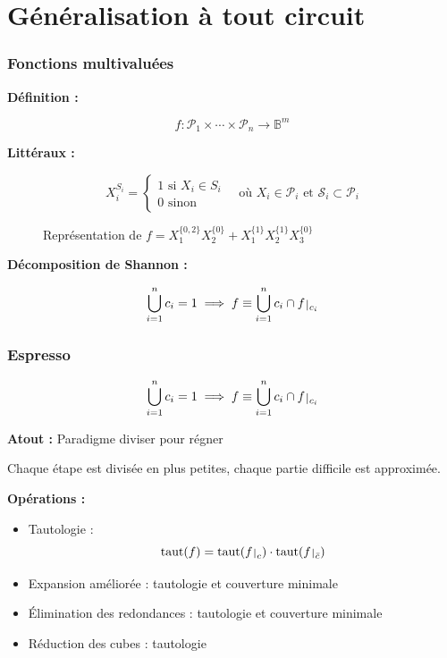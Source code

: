 \documentclass[handout]{beamer}
\newcommand{\ens}[1]{{\lbrace{} #1 \rbrace{}}}
\DeclareMathOperator{\istautology}{taut}
\def\restriction#1#2{\mathchoice
              {\setbox1\hbox{${\displaystyle #1}_{\scriptstyle #2}$}
              \restrictionaux{#1}{#2}}
              {\setbox1\hbox{${\textstyle #1}_{\scriptstyle #2}$}
              \restrictionaux{#1}{#2}}
              {\setbox1\hbox{${\scriptstyle #1}_{\scriptscriptstyle #2}$}
              \restrictionaux{#1}{#2}}
              {\setbox1\hbox{${\scriptscriptstyle #1}_{\scriptscriptstyle #2}$}
              \restrictionaux{#1}{#2}}}
\def\restrictionaux#1#2{{#1\,\smash{\vrule height .8\ht1 depth .85\dp1}}_{\,#2}}
\begin{document}
\section{Généralisation à tout circuit}
\begin{frame}
  \frametitle{Fonctions multivaluées}

  \textbf{Définition :}
  \begin{mdframed}
  \[ f: \mathcal{P}_1 \times \cdots \times \mathcal{P}_n \longrightarrow \mathbb{B}^m \]
  \end{mdframed}

  \textbf{Littéraux :} 
  \begin{mdframed}
  \[{X_i^{S_i} = %
  \begin{cases}
    1 \text{ si } X_i \in S_i \\
    0 \text{ sinon}
  \end{cases}
  \quad \text{où } X_i \in \mathcal{P}_i \text{ et } \mathcal{S}_i \subset \mathcal{P}_i} \]
    \end{mdframed}  
  
  
  \begin{figure}
  \centering
	  \begin{tikzpicture}[scale=2]  
  		
	  \end{tikzpicture}
	  \caption{Représentation de $f = X_1^\ens{0,2} X_2^\ens{0} + X_1^\ens{1} X_2^\ens{1}X_3^\ens{0}$}
	\end{figure}

  \textbf{Décomposition de Shannon :}
  \begin{mdframed}
  \[ \bigcup_{i=1}^n c_i = 1 \implies f \equiv \bigcup_{i=1}^{n} c_i \cap \restriction{f}{c_i} \]
  \end{mdframed}

\end{frame}



\begin{frame}
  \frametitle{Espresso}

	\begin{mdframed}
  \[ \bigcup_{i=1}^n c_i = 1 \implies f \equiv \bigcup_{i=1}^{n} c_i \cap \restriction{f}{c_i} \]
  \end{mdframed}

  \textbf{Atout :} Paradigme diviser pour régner
  \par Chaque étape est divisée en plus petites, chaque partie difficile est approximée.
  
  \vfill\null
  
  \textbf{Opérations :}  
  \begin{itemize}
  \item Tautologie : 
  \[ \istautology(f) = \istautology(\restriction{f}{c}) \cdot \istautology(\restriction{f}{\bar{c}}) \]
  \item Expansion améliorée : tautologie et couverture minimale
  \item Élimination des redondances : tautologie et couverture minimale
  \item Réduction des cubes : tautologie
  \end{itemize}

  
\end{frame}
\end{document}

